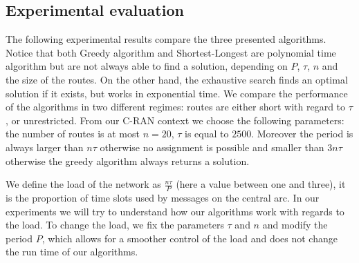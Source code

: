 \documentclass[10pt, conference, letterpaper]{IEEEtran}
\begin{document}
%        
%       


    \subsection{Experimental evaluation}\label{sec:exp_PAZL}
      
      The following experimental results compare the three presented algorithms.
      Notice that both Greedy algorithm and Shortest-Longest are polynomial time algorithm but are not always able to find a solution, depending on $P$, $\tau$, $n$ and the size of the routes. On the other hand, the exhaustive search finds an optimal solution if it exists, but works in exponential time. We compare the performance of the algorithms in two different regimes: routes are either short with regard to $\tau$, or unrestricted.
      From our C-RAN context we choose the following parameters: the number of routes 
      is at most $n = 20$, $\tau$ is equal to $2500$. Moreover the period is always larger than $n\tau$ otherwise no assignment is possible and smaller than $3n\tau$ otherwise the greedy algorithm always returns a solution.



      
      We define the load of the network as $\frac{n\tau}{P}$ (here a value between one and three),
      it is the proportion of time slots used by messages on the central arc. In our experiments we will try to understand how our algorithms work with regards to the load. To change the load, we fix the parameters $\tau$ and $n$ and modify the period $P$, which allows for a smoother control of the load and does not change the run time of our algorithms.
      
\end{document}
